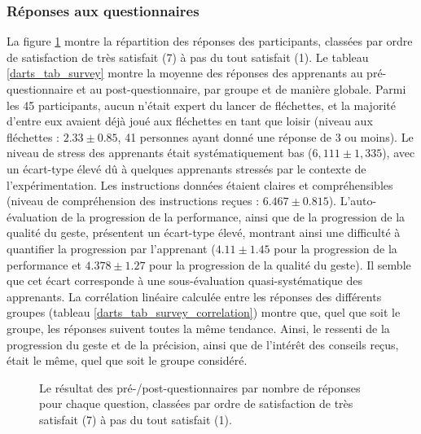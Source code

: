 \subsubsection{Réponses aux questionnaires}
La figure \ref{fig:graph_questionnaires} montre la répartition des réponses des participants, classées par ordre de satisfaction de très satisfait (7) à pas du tout satisfait (1). Le tableau \ref{darts_tab_survey} montre la moyenne des réponses des apprenants au pré-questionnaire et au post-questionnaire, par groupe et de manière globale. Parmi les 45 participants, aucun n'était expert du lancer de fléchettes, et la majorité d'entre eux avaient déjà joué aux fléchettes en tant que loisir (niveau aux fléchettes : $2.33 \pm 0.85$, 41 personnes ayant donné une réponse de 3 ou moins). Le niveau de stress des apprenants était systématiquement bas ($6,111 \pm 1,335$), avec un écart-type élevé dû à quelques apprenants stressés par le contexte de l'expérimentation. Les instructions données étaient claires et compréhensibles (niveau de compréhension des instructions reçues : $6.467 \pm 0.815$). L'auto-évaluation de la progression de la performance, ainsi que de la progression de la qualité du geste, présentent un écart-type élevé, montrant ainsi une difficulté à quantifier la progression par l'apprenant ($4.11 \pm 1.45$ pour la progression de la performance et $4.378 \pm 1.27$ pour la progression de la qualité du geste). Il semble que cet écart corresponde à une sous-évaluation quasi-systématique des apprenants. La corrélation linéaire calculée entre les réponses des différents groupes (tableau \ref{darts_tab_survey_correlation}) montre que, quel que soit le groupe, les réponses suivent toutes la même tendance. Ainsi, le ressenti de la progression du geste et de la précision, ainsi que de l'intérêt des conseils reçus, était le même, quel que soit le groupe considéré.

\begin{figure}
    \centering
    \caption[Résultats des questionnaires]{Le résultat des pré-/post-questionnaires par nombre de réponses pour chaque question, classées par ordre de satisfaction de très satisfait (7) à pas du tout satisfait (1).}
    \label{fig:graph_questionnaires}
\end{figure}


